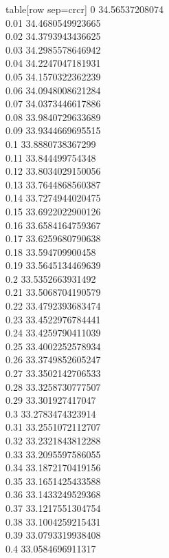   table[row sep=crcr]{%
0	34.56537208074\\
0.01	34.4680549923665\\
0.02	34.3793943436625\\
0.03	34.2985578646942\\
0.04	34.2247047181931\\
0.05	34.1570322362239\\
0.06	34.0948008621284\\
0.07	34.0373446617886\\
0.08	33.9840729633689\\
0.09	33.9344669695515\\
0.1	33.8880738367299\\
0.11	33.844499754348\\
0.12	33.8034029150056\\
0.13	33.7644868560387\\
0.14	33.7274944020475\\
0.15	33.6922022900126\\
0.16	33.6584164759367\\
0.17	33.6259680790638\\
0.18	33.594709900458\\
0.19	33.5645134469639\\
0.2	33.5352663931492\\
0.21	33.5068704190579\\
0.22	33.4792393683474\\
0.23	33.4522976784441\\
0.24	33.4259790411039\\
0.25	33.4002252578934\\
0.26	33.3749852605247\\
0.27	33.3502142706533\\
0.28	33.3258730777507\\
0.29	33.301927417047\\
0.3	33.2783474323914\\
0.31	33.2551072112707\\
0.32	33.2321843812288\\
0.33	33.2095597586055\\
0.34	33.1872170419156\\
0.35	33.1651425433588\\
0.36	33.1433249529368\\
0.37	33.1217551304754\\
0.38	33.1004259215431\\
0.39	33.0793319938408\\
0.4	33.0584696911317\\
}
